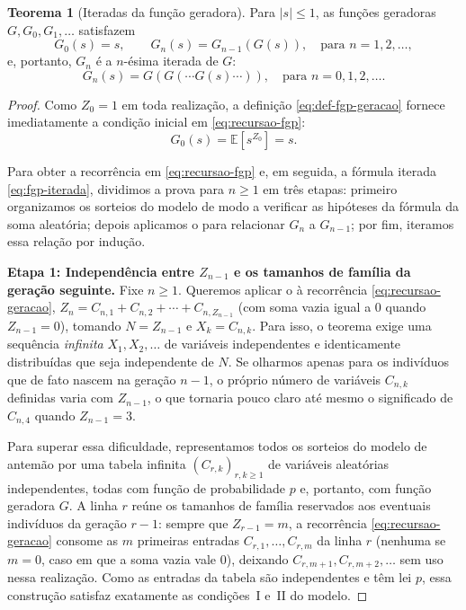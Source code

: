 \documentclass[12pt,portuguese]{article}
\theoremstyle{definition}
\newtheorem{theorem}{Teorema}
\theoremstyle{plainexercise}
\theoremstyle{starredexercise}
\theoremstyle{definition}
\begin{document}
\begin{theorem}[Iteradas da função geradora]\label{thm:fgp-iterada}
Para $|s|\leqslant 1$, as funções geradoras $G,G_0,G_1,\ldots$ satisfazem
\begin{equation}\label{eq:recursao-fgp}
G_0(s)=s,
\qquad
G_n(s)=G_{n-1}(G(s)),
\quad\text{para } n=1,2,\ldots,
\end{equation}
e, portanto, $G_n$ é a $n$-ésima iterada de $G$:
\begin{equation}\label{eq:fgp-iterada}
G_n(s)=G(G(\cdots G(s)\cdots)),
\quad\text{para } n=0,1,2,\ldots.
\end{equation}
\end{theorem}

\begin{proof}
Como $Z_0=1$ em toda realização, a definição \eqref{eq:def-fgp-geracao}
fornece imediatamente a condição inicial em \eqref{eq:recursao-fgp}:
\begin{equation}\label{eq:fgp-geracao-zero}
G_0(s)=\mathbb{E}[s^{Z_0}]=s.
\end{equation}

Para obter a recorrência em \eqref{eq:recursao-fgp} e, em seguida, a
fórmula iterada \eqref{eq:fgp-iterada}, dividimos a prova para $n\geqslant 1$
em três etapas: primeiro organizamos os sorteios do modelo de modo a
verificar as hipóteses da fórmula da soma aleatória; depois aplicamos o
 para relacionar $G_n$ a $G_{n-1}$; por fim,
iteramos essa relação por indução.

\smallskip
\noindent\textbf{Etapa 1: Independência entre $Z_{n-1}$ e os tamanhos de
família da geração seguinte.}
Fixe $n\geqslant 1$. Queremos aplicar o  à
recorrência \eqref{eq:recursao-geracao},
$Z_n=C_{n,1}+C_{n,2}+\cdots+C_{n,Z_{n-1}}$ (com soma vazia igual a $0$
quando $Z_{n-1}=0$), tomando $N=Z_{n-1}$ e $X_k=C_{n,k}$. Para isso, o
teorema exige uma sequência \emph{infinita} $X_1,X_2,\ldots$ de
variáveis independentes e identicamente distribuídas que seja
independente de $N$. Se olharmos apenas para os indivíduos que de fato
nascem na geração $n-1$, o próprio número de variáveis $C_{n,k}$
definidas varia com $Z_{n-1}$, o que tornaria pouco claro até mesmo o
significado de $C_{n,4}$ quando $Z_{n-1}=3$.

Para superar essa dificuldade, representamos todos os sorteios do
modelo de antemão por uma tabela infinita $(C_{r,k})_{r,k\geqslant 1}$
de variáveis aleatórias independentes, todas com função de probabilidade
$p$ e, portanto, com função geradora $G$. A linha $r$ reúne os tamanhos
de família reservados aos eventuais indivíduos da geração $r-1$: sempre
que $Z_{r-1}=m$, a recorrência \eqref{eq:recursao-geracao} consome as $m$
primeiras entradas $C_{r,1},\ldots,C_{r,m}$ da linha $r$ (nenhuma se
$m=0$, caso em que a soma vazia vale $0$), deixando
$C_{r,m+1},C_{r,m+2},\ldots$ sem uso nessa realização. Como as entradas
da tabela são independentes e têm lei $p$, essa construção satisfaz
exatamente as condições~I e~II do modelo.


\end{proof}
\end{document}
